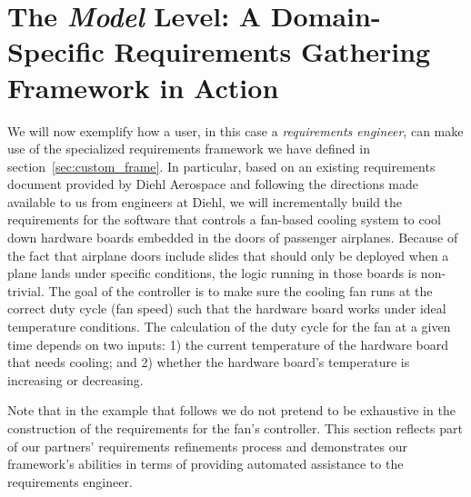 \section{The \emph{Model} Level: A Domain-Specific Requirements Gathering
Framework in Action}
\label{sec:model}
\vspace{-.2cm}
We will now exemplify how a user, in this case a \emph{requirements engineer},
can make use of the specialized requirements framework we have defined in section~\ref{sec:custom_frame}.
In particular, based on an existing requirements document provided by Diehl
Aerospace and following the directions made available to us from engineers at
Diehl, we will incrementally build the requirements for the software that
controls a fan-based cooling system to cool down hardware boards embedded in
the doors of passenger airplanes.
Because of the fact that airplane doors include slides that should only be
deployed when a plane lands under specific conditions, the logic running in
those boards is non-trivial. The goal of the controller is to make
sure the cooling fan runs at the correct duty cycle (fan speed) such that the 
hardware board works under ideal temperature conditions. The calculation of
the duty cycle for the fan at a given time depends on two inputs:
1) the current temperature of the hardware board that needs cooling; and 2)
whether the hardware board's temperature is increasing or decreasing.
 

Note that in the example that follows we do not pretend to be exhaustive in the
construction of the requirements for the fan's controller. This section
reflects part of our partners' requirements refinements process and demonstrates
our framework's abilities in terms of providing automated assistance to the
requirements engineer. 
\vspace{-.3cm}
